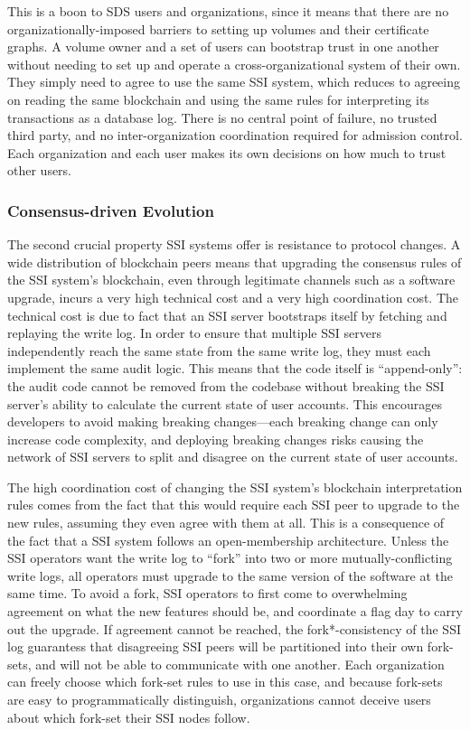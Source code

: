 This is a boon to SDS users and organizations, since it means
that there are no organizationally-imposed barriers to setting up volumes and
their certificate graphs.  A volume owner and a set of users can bootstrap trust
in one another without needing to set up and operate a cross-organizational
system of their own.  They simply need to agree to use the same SSI system,
which reduces to agreeing on reading the same blockchain and using the same rules for
interpreting its transactions as a database log.  There is no central point of
failure, no trusted third party, and no inter-organization coordination required
for admission control.  Each organization and each user makes its own decisions
on how much to trust other users.

\subsubsection{Consensus-driven Evolution}

The second crucial property SSI systems offer is resistance to protocol changes.
A wide distribution of blockchain peers means that upgrading
the consensus rules of the SSI system's blockchain, even through legitimate channels such as a 
software upgrade, incurs a very high technical cost and a very high coordination cost.
The technical cost is due to fact that an SSI server
bootstraps itself by fetching and replaying the write log.  In order to
ensure that multiple SSI servers independently reach the same state from the
same write log, they must each implement the same audit logic.  This means that
the code itself is ``append-only'':  the audit code cannot be removed from
the codebase without breaking the SSI server's ability to calculate the current
state of user accounts.  This encourages developers to avoid making breaking
changes---each breaking change can only increase code complexity,
and deploying breaking changes risks causing the network of SSI servers to split
and disagree on the current state of user accounts.

The high coordination cost of changing the SSI system's blockchain
interpretation rules comes from the fact that this would require each SSI peer to upgrade
to the new rules, assuming they even agree with them at all.  This is a
consequence of the fact that a SSI system follows an open-membership
architecture.  Unless the SSI
operators want the write log to ``fork'' into two or more mutually-conflicting
write logs, all operators must upgrade to the same version of the software
at the same time.  To avoid a fork, SSI operators to first come to overwhelming
agreement on what the new features should be, and coordinate a flag day
to carry out the upgrade.  If agreement cannot be reached, the fork*-consistency
of the SSI log guarantess that disagreeing SSI peers will be partitioned into
their own fork-sets, and will not be able to communicate with one another.  Each
organization can freely choose which fork-set rules to use in this case, and
because fork-sets are easy to programmatically distinguish, organizations cannot
deceive users about which fork-set their SSI nodes follow.

